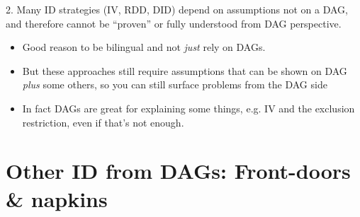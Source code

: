 \documentclass[xcolor=dvipsnames]{beamer}
\begin{document}
\begin{frame}{}
2. Many ID strategies (IV, RDD, DID) depend on assumptions not on a DAG, and therefore cannot be ``proven'' or fully understood from DAG perspective.
\small
\begin{itemize}
\item Good reason to be bilingual and not \textit{just} rely on DAGs. 
\item But these approaches still require assumptions that can be shown on DAG \textit{plus} some others, so you can still surface problems from the DAG side
\item In fact DAGs are great for explaining some things, e.g. IV and the exclusion restriction, even if that's not enough.
\end{itemize}
\end{frame}

\section{Other ID from DAGs: Front-doors \& napkins}
\end{document}
